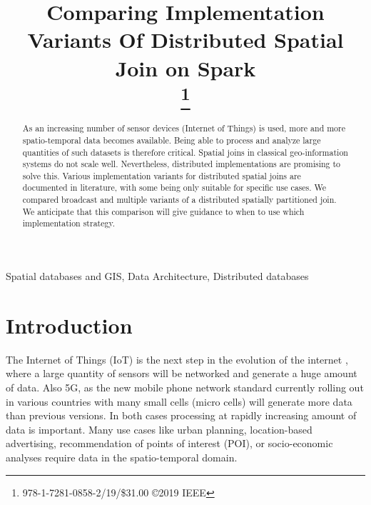\documentclass[conference]{IEEEtran}
\begin{document}
\title{Comparing Implementation Variants Of Distributed Spatial Join on Spark\\
\thanks{978-1-7281-0858-2/19/\$31.00 \copyright 2019 IEEE}
}

\author{
\and
{}

}

\maketitle

\begin{abstract}
As an increasing number of sensor devices (Internet of Things) is used, more and more spatio-temporal data becomes available.
Being able to process and analyze large quantities of such datasets is therefore critical.
Spatial joins in classical geo-information systems do not scale well.
Nevertheless, distributed implementations are promising to solve this.
Various implementation variants for distributed spatial joins are documented in literature, with some being only suitable for specific use cases.
We compared broadcast and multiple variants of a distributed spatially partitioned join.
We anticipate that this comparison will give guidance to when to use which implementation strategy.
\end{abstract}

\begin{IEEEkeywords}
Spatial databases and GIS, Data Architecture, Distributed databases
\end{IEEEkeywords}

\section{Introduction}
The Internet of Things (IoT) is the next step in the evolution of the internet \cite{Lin2017}, where a large quantity of sensors will be networked and generate a huge amount of data.
Also 5G, as the new mobile phone network standard currently rolling out in various countries with many small cells (micro cells) will generate more data than previous versions.
In both cases processing at rapidly increasing amount of data is important.
Many use cases like urban planning, location-based advertising, recommendation of points of interest (POI), or socio-economic analyses require data in the spatio-temporal domain.
\end{document}
